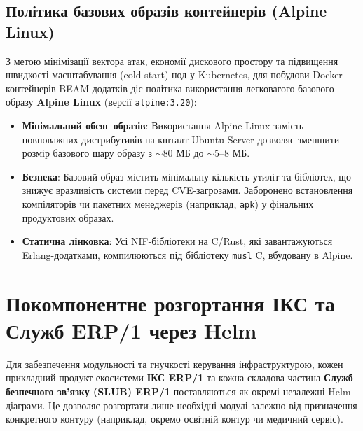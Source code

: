 \documentclass{article}
\begin{document}
\subsection{Політика базових образів контейнерів (Alpine Linux)}
 
З метою мінімізації вектора атак, економії дискового простору та підвищення швидкості масштабування (cold start) нод у Kubernetes, для побудови Docker-контейнерів BEAM-додатків діє політика використання легковагого базового образу \textbf{Alpine Linux} (версії \texttt{alpine:3.20}):
\begin{itemize}
    \item \textbf{Мінімальний обсяг образів}: Використання Alpine Linux замість повноважних дистрибутивів на кшталт Ubuntu Server дозволяє зменшити розмір базового шару образу з $\sim$80 МБ до $\sim$5--8 МБ.
    \item \textbf{Безпека}: Базовий образ містить мінімальну кількість утиліт та бібліотек, що знижує вразливість системи перед CVE-загрозами. Заборонено встановлення компіляторів чи пакетних менеджерів (наприклад, \texttt{apk}) у фінальних продуктових образах.
    \item \textbf{Статична лінковка}: Усі NIF-бібліотеки на C/Rust, які завантажуються Erlang-додатками, компилюються під бібліотеку \texttt{musl} C, вбудовану в Alpine.
\end{itemize}

\section{Покомпонентне розгортання ІКС та Служб ERP/1 через Helm}
  
Для забезпечення модульності та гнучкості керування інфраструктурою, кожен прикладний продукт екосистеми \textbf{ІКС ERP/1} та кожна складова частина \textbf{Служб безпечного зв'язку (SLUB) ERP/1} поставляються як окремі незалежні Helm-діаграми. Це дозволяє розгортати лише необхідні модулі залежно від призначення конкретного контуру (наприклад, окремо освітній контур чи медичний сервіс).
\end{document}
